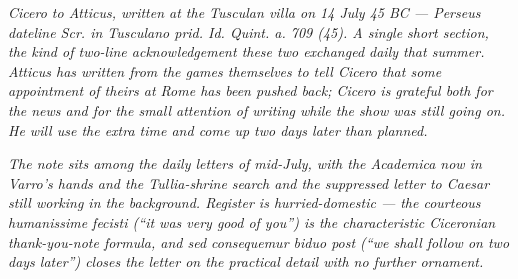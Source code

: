 
\textit{Cicero to Atticus, written at the Tusculan villa on 14 July
45 BC --- Perseus dateline \textit{Scr. in Tusculano prid. Id.
Quint. a. 709 (45)}. A single short section, the kind of two-line
acknowledgement these two exchanged daily that summer. Atticus has
written from the games themselves to tell Cicero that some
appointment of theirs at Rome has been pushed back; Cicero is
grateful both for the news and for the small attention of writing
while the show was still going on. He will use the extra time and
come up two days later than planned.}

\textit{The note sits among the daily letters of mid-July, with
the \textit{Academica} now in Varro's hands and the Tullia-shrine
search and the suppressed letter to Caesar still working in the
background. Register is hurried-domestic --- the courteous
\textit{humanissime fecisti} (``it was very good of you'') is the
characteristic Ciceronian thank-you-note formula, and \textit{sed
consequemur biduo post} (``we shall follow on two days later'')
closes the letter on the practical detail with no further
ornament.}
